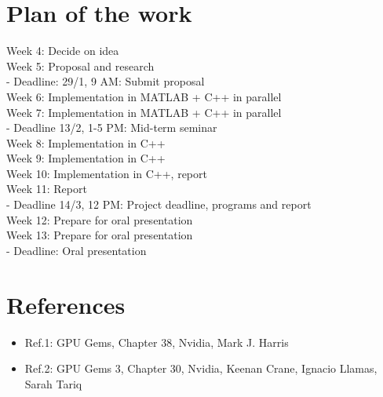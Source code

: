 \documentclass[a4paper,12pt,twoside,swedish]{report}
\begin{document}
\section{Plan of the work}
Week 4: Decide on idea \\
Week 5: Proposal and research \\
- Deadline: 29/1, 9 AM: Submit proposal \\
Week 6: Implementation in MATLAB + C++ in parallel \\
Week 7: Implementation in MATLAB + C++ in parallel \\
- Deadline 13/2, 1-5 PM: Mid-term seminar \\
Week 8: Implementation in C++ \\
Week 9: Implementation in C++ \\
Week 10: Implementation in C++, report \\
Week 11: Report \\
- Deadline 14/3, 12 PM: Project deadline, programs and report \\
Week 12: Prepare for oral presentation \\
Week 13: Prepare for oral presentation \\
- Deadline: Oral presentation

\section{References}
\begin{itemize}
\item Ref.1: GPU Gems, Chapter 38, Nvidia, Mark J. Harris
\item Ref.2: GPU Gems 3, Chapter 30, Nvidia, Keenan Crane, Ignacio Llamas, Sarah Tariq
\end{itemize}
\end{document}
